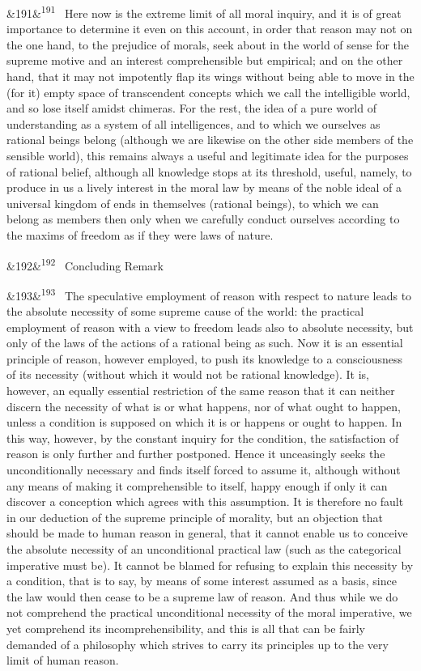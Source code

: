 \documentclass[12pt]{article}
\newcommand{\para}[1][]{\par\noindent\ifx&#1&\else\textsuperscript{\footnotesize #1}~\fi}
\begin{document}
\para[191] Here now is the extreme limit of all moral inquiry, and it is of great importance to determine it even on this account, in order that reason may not on the one hand, to the prejudice of morals, seek about in the world of sense for the supreme motive and an interest comprehensible but empirical; and on the other hand, that it may not impotently flap its wings without being able to move in the (for it) empty space of transcendent concepts which we call the intelligible world, and so lose itself amidst chimeras. For the rest, the idea of a pure world of understanding as a system of all intelligences, and to which we ourselves as rational beings belong (although we are likewise on the other side members of the sensible world), this remains always a useful and legitimate idea for the purposes of rational belief, although all knowledge stops at its threshold, useful, namely, to produce in us a lively interest in the moral law by means of the noble ideal of a universal kingdom of ends in themselves (rational beings), to which we can belong as members then only when we carefully conduct ourselves according to the maxims of freedom as if they were laws of nature.

\para[192] Concluding Remark

\para[193] The speculative employment of reason with respect to nature leads to the absolute necessity of some supreme cause of the world: the practical employment of reason with a view to freedom leads also to absolute necessity, but only of the laws of the actions of a rational being as such. Now it is an essential principle of reason, however employed, to push its knowledge to a consciousness of its necessity (without which it would not be rational knowledge). It is, however, an equally essential restriction of the same reason that it can neither discern the necessity of what is or what happens, nor of what ought to happen, unless a condition is supposed on which it is or happens or ought to happen. In this way, however, by the constant inquiry for the condition, the satisfaction of reason is only further and further postponed. Hence it unceasingly seeks the unconditionally necessary and finds itself forced to assume it, although without any means of making it comprehensible to itself, happy enough if only it can discover a conception which agrees with this assumption. It is therefore no fault in our deduction of the supreme principle of morality, but an objection that should be made to human reason in general, that it cannot enable us to conceive the absolute necessity of an unconditional practical law (such as the categorical imperative must be). It cannot be blamed for refusing to explain this necessity by a condition, that is to say, by means of some interest assumed as a basis, since the law would then cease to be a supreme law of reason. And thus while we do not comprehend the practical unconditional necessity of the moral imperative, we yet comprehend its incomprehensibility, and this is all that can be fairly demanded of a philosophy which strives to carry its principles up to the very limit of human reason.
\end{document}
